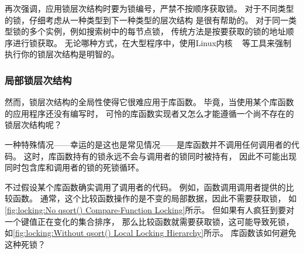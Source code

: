 再次强调，应用锁层次结构时要为锁编号，严禁不按顺序获取锁。
对于不同类型的锁，仔细考虑从一种类型到下一种类型的层次结构
是很有帮助的。
对于同一类型锁的多个实例，例如搜索树中的每节点锁，
传统方法是按要获取的锁的地址顺序进行锁获取。
无论哪种方式，在大型程序中，使用Linux内核
~\cite{JonathanCorbet2006lockdep}
等工具来强制执行你的锁层次结构是明智的。

\subsubsection{局部锁层次结构}
\label{sec:locking:Local Locking Hierarchies}

然而，锁层次结构的全局性使得它很难应用于库函数。
毕竟，当使用某个库函数的应用程序还没有编写时，
可怜的库函数实现者又怎么才能遵循一个尚不存在的锁层次结构呢？

一种特殊情况——幸运的是这也是常见情况——是库函数并不调用任何调用者的代码。
这时，库函数持有的锁永远不会与调用者的锁同时被持有，
因此不可能出现同时包含库和调用者的锁的死锁循环。

\QuickQuizEnd

不过假设某个库函数确实调用了调用者的代码。
例如，函数调用调用者提供的比较函数。
通常，这个比较函数操作的是不变的局部数据，因此不需要获取锁，
如\cref{fig:locking:No qsort() Compare-Function Locking}所示。
但如果有人疯狂到要对一个键值正在变化的集合排序，
那么比较函数就需要获取锁，这可能导致死锁，
如\cref{fig:locking:Without qsort() Local Locking Hierarchy}所示。
库函数该如何避免这种死锁？

